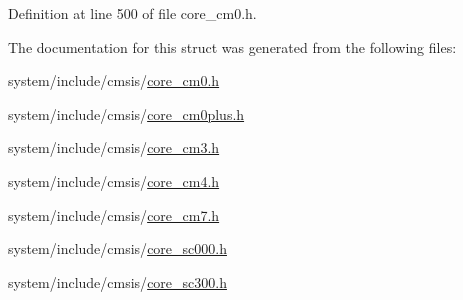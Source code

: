 Definition at line 500 of file core\+\_\+cm0.\+h.



The documentation for this struct was generated from the following files\+:\begin{DoxyCompactItemize}
\item 
system/include/cmsis/\hyperlink{core__cm0_8h}{core\+\_\+cm0.\+h}\item 
system/include/cmsis/\hyperlink{core__cm0plus_8h}{core\+\_\+cm0plus.\+h}\item 
system/include/cmsis/\hyperlink{core__cm3_8h}{core\+\_\+cm3.\+h}\item 
system/include/cmsis/\hyperlink{core__cm4_8h}{core\+\_\+cm4.\+h}\item 
system/include/cmsis/\hyperlink{core__cm7_8h}{core\+\_\+cm7.\+h}\item 
system/include/cmsis/\hyperlink{core__sc000_8h}{core\+\_\+sc000.\+h}\item 
system/include/cmsis/\hyperlink{core__sc300_8h}{core\+\_\+sc300.\+h}\end{DoxyCompactItemize}
